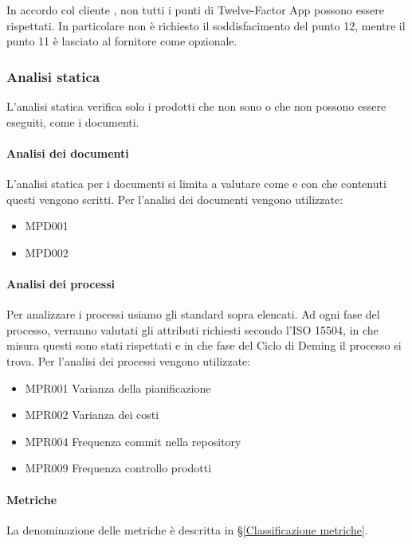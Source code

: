 		In accordo col cliente \II, non tutti i punti di Twelve-Factor App possono essere rispettati. In particolare non è richiesto il soddisfacimento del punto 12, mentre il punto 11 è lasciato al fornitore come opzionale.
		
		
		\subsubsection{Analisi statica}
		L'analisi statica verifica solo i prodotti che non sono o che non possono essere eseguiti, come i documenti.

			\paragraph{Analisi dei documenti}
			L'analisi statica per i documenti si limita a valutare come e con che contenuti questi vengono scritti.
			Per l'analisi dei documenti vengono utilizzate:

			\begin{itemize}
				\item MPD001
				\item MPD002
			\end{itemize}

			\paragraph{Analisi dei processi}
			Per analizzare i processi usiamo gli standard sopra elencati. Ad ogni fase del processo, verranno valutati gli attributi richiesti secondo
			l'ISO 15504, in che misura questi sono stati rispettati e in che fase del Ciclo di Deming il processo si trova.
			Per l'analisi dei processi vengono utilizzate:

			\begin{itemize}
				\item MPR001 Varianza della pianificazione
				\item MPR002 Varianza dei costi
				\item MPR004 Frequenza commit nella repository
				\item MPR009 Frequenza controllo prodotti
			\end{itemize}


			\paragraph{Metriche}
			La denominazione delle metriche è descritta in \S\ref{Classificazione metriche}.
		
